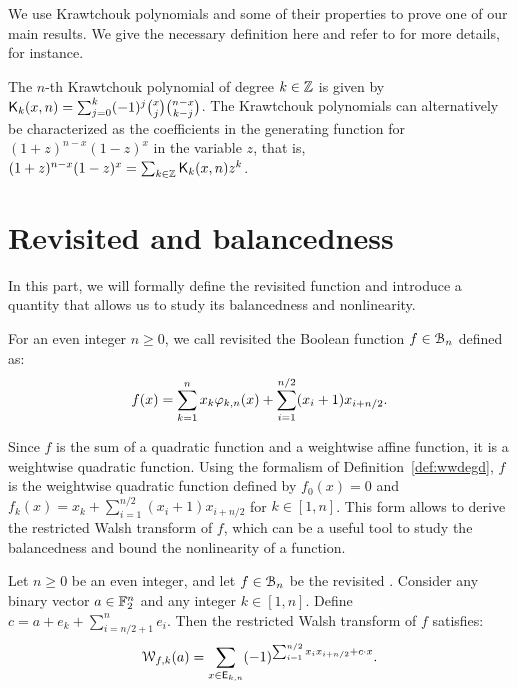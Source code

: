 \documentclass{llncs}
\begin{document}
We use Krawtchouk polynomials and some of their properties to prove one of our main results. We give the necessary definition here and refer to \cite{book:MacSlo78} for more details, for instance.

\begin{definition}\label{def:Kraw}
	The $n$-th Krawtchouk polynomial of degree $k\in\mathbb{Z}$ is given by $\mathsf{K}_{k}(x,n)=\sum_{j=0}^{k} (-1)^j \binom{x}{j} \binom{n-x}{k-j}$. The Krawtchouk polynomials can alternatively be characterized as the coefficients in the generating function for $(1+z)^{n-x} (1-z)^x$ in the variable $z$, that is, $(1+z)^{n-x} (1-z)^x=\sum_{k\in\mathbb{Z}} \mathsf{K}_{k}(x,n) z^k$.
\end{definition} 

\section{Revisited \hwbf{} and balancedness}\label{sec:defAndBal}

In this part, we will formally define the revisited \hwbf{} function and introduce a quantity that allows us to study its balancedness and nonlinearity.

\begin{definition}\label{def:revHWBF}
	For an even integer $n\geq 0$, we call revisited \hwbf{} the Boolean function $f\in\mathcal{B}_n$ defined as:
	\[
		f(x)=\sum_{k=1}^nx_k\varphi_{k,n}(x)+\sum_{i=1}^{n/2}(x_i+1) x_{i+n/2}.
	\]
\end{definition}

Since $f$ is the sum of a quadratic function and a weightwise affine function, it is a weightwise quadratic function. Using the formalism of Definition~\ref{def:wwdegd}, $f$ is the weightwise quadratic function defined by $f_0(x)=0$ and $f_k(x)=x_k+\sum_{i=1}^{n/2}(x_i+1) x_{i+n/2}$ for $k\in[1,n]$. This form allows to derive the restricted Walsh transform of $f$, which can be a useful tool to study the balancedness and bound the nonlinearity of a function.

\begin{proposition}\label{prop:restrWT}
	Let $n\geq 0$ be an even integer, and let $f\in\mathcal{B}_n$ be the revisited \hwbf{}. Consider any binary vector $a\in\mathbb{F}_2^n$ and any integer $k\in[1,n]$. Define $c=a+e_k+\sum_{i=n/2+1}^n e_i$. Then the restricted Walsh transform of $f$ satisfies:
	\[
		\mathcal{W}_{f,k}(a)=\sum_{x \in \mathsf{E}_{k,n}} (-1)^{\sum_{i=1}^{n/2} x_i x_{i+n/2}+ c \cdot x}.
	\]
\end{proposition}
\end{document}
